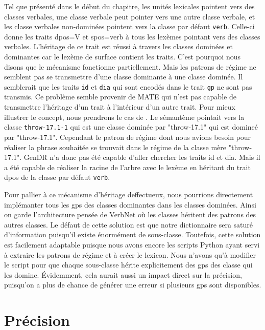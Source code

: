 Tel que présenté dans le début du chapitre, les unités lexicales pointent vers des classes verbales, une classe verbale peut pointer vers une autre classe verbale, et les classe verbales non-dominées pointent vers la classe par défaut \texttt{verb}. Celle-ci donne les traits dpos=V et spos=verb à tous les lexèmes pointant vers des classes verbales. L'héritage de ce trait est réussi à travers les classes dominées et dominantes car le lexème de surface contient les traits. C'est pourquoi nous disons que le mécanisme fonctionne partiellement. Mais les patrons de régime ne semblent pas se transmettre d'une classe dominante à une classe dominée. Il semblerait que les traits \texttt{id} et \texttt{dia} qui sont encodés dans le trait \texttt{gp} ne sont pas transmis. Ce problème semble provenir de MATE qui n'est pas capable de transmettre l'héritage d'un trait à l'intérieur d'un autre trait. Pour mieux illustrer le concept, nous prendrons le cas de . Le sémantème  pointait vers la classe \texttt{throw-17.1-1} qui est une classe dominée par "throw-17.1" qui est domineé par "throw-17.1". Cependant le patron de régime dont nous avions besoin pour réaliser la phrase souhaitée se trouvait dans le régime de la classe mère "throw-17.1". GenDR n'a donc pas été capable d'aller chercher les traits id et dia. Mais il a été capable de réaliser la racine de l'arbre avec le lexème  en héritant du trait dpos de la classe par défaut \texttt{verb}.

Pour pallier à ce mécanisme d'héritage deffectueux, nous pourrions directement implémanter tous les gps des classes dominantes dans les classes dominées. Ainsi on garde l'architecture pensée de VerbNet où les classes héritent des patrons des autres classes. Le défaut de cette solution est que notre dictionnaire sera saturé d'information puisqu'il existe énormément de sous-classe. Toutefois, cette solution est facilement adaptable puisque nous avons encore les scripts Python ayant servi à extraire les patrons de régime et à créer le lexicon. Nous n'avons qu'à modifier le script pour que chaque sous-classe hérite explicitement des gps des classe qui les domine. Évidemment, cela aurait aussi un impact direct sur la précision, puisqu'on a plus de chance de générer une erreur si plusieurs gps sont disponibles.

\section{Précision}

